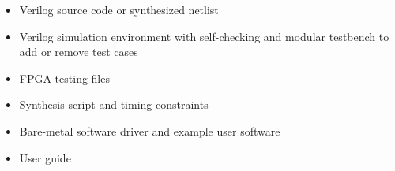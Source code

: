 \begin{itemize}
  \itemsep-0.5em
\item Verilog source code or synthesized netlist
\item Verilog simulation environment with self-checking and modular testbench to add or remove test cases
\item FPGA testing files
\item Synthesis script and timing constraints
\item Bare-metal software driver and example user software
\item User guide
\end{itemize}
